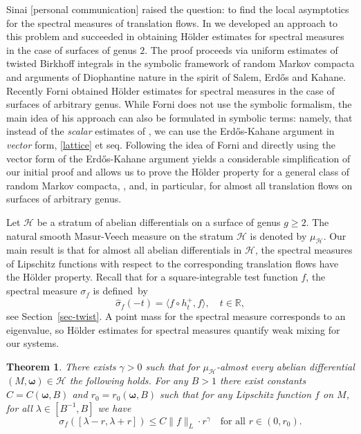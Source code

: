 \documentclass[JEP,XML,SOM,Unicode]{cedram}
\let\mathcal\mathscr
\theoremstyle{plain}
\newtheorem{theorem}{Theorem}[section]
\theoremstyle{definition}
\newcommand{\omb}{\boldsymbol \omega}
\let\lam\lambda
\let\sig\sigma
\newcommand{\HH}{\mathcal{H}}
\newcommand{\R}{\mathbb{R}}
\newcommand\be{\begin{equation}}
\newcommand\ee{\end{equation}}
\begin{document}
Sinai [personal communication] raised the question: to find the local asymptotics for the spectral measures of translation flows.
In \cite{BuSo18a,BuSo19} we developed an approach to this problem and succeeded in obtaining Hölder estimates for spectral measures in the case of surfaces of genus $2$.
The proof proceeds via uniform estimates of twisted Birkhoff integrals
in the symbolic
framework of random Markov compacta and arguments of Diophantine nature in the spirit of Salem, Erd\H{o}s and Kahane.
Recently Forni \cite{Forni2} obtained Hölder estimates for spectral measures in the case of surfaces of arbitrary genus. While Forni does not use the symbolic formalism, the main idea of his approach can also be formulated in symbolic terms: namely, that instead of the {\it scalar} estimates of \cite{BuSo18a,BuSo19}, we can use the Erd\H{o}s-Kahane argument in {\it vector} form, \cf \eqref{lattice} et seq.
Following the idea of Forni and directly using the vector form of the Erd\H{o}s-Kahane argument yields a considerable simplification of our initial proof and allows us to prove the Hölder property for a general class of random Markov compacta, \cf \cite{Buf-umn}, and, in particular, for almost all translation flows on surfaces of arbitrary genus.

Let $\HH$ be a stratum of abelian differentials on a surface of genus $g\ge 2$. The natural smooth Masur-Veech measure on the stratum $\HH$ is denoted by $\mu_\HH$.
Our main result is
that for almost all abelian differentials in $\HH$, the spectral measures of Lipschitz functions with respect to the corresponding translation flows have the Hölder property.
Recall that for a square-integrable test function $f$, the spectral measure $\sig_f$ is defined~by\vspace*{-5pt}\enlargethispage{.5\baselineskip}%
\[
\widehat{\sig}_f(-t) = \langle f\circ h_t^+, f \rangle,\quad t\in \R,
\]
see Section~\ref{sec-twist}.
A point mass for the spectral measure corresponds to an eigenvalue, so Hölder estimates for spectral measures quantify weak mixing for our systems.

\begin{theorem}\label{main-moduli}
There exists $\gamma>0$ such that for $\mu_\HH$-almost every abelian differential $(M, \omb)\in \HH$ the following holds. For any $B>1$ there exist constants $C=C(\omb,B)$ and $r_0=r_0(\omb,B)$ such that for any Lipschitz function $f$ on $M$, for all $\lam\in [B^{-1},B]$ we have\vspace*{-5pt}
\be \label{eq-moduli}
\sig_f([\lam-r, \lam+r])\le C\|f\|_L\cdot r^\gamma\quad\text{for all } r\in (0, r_0).
\ee
\end{theorem}
\end{document}
